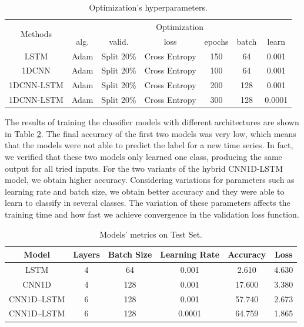 \begin{table}[h]
	\centering
	\small
	\begin{tabular}{|c|c|c|c|c|c|c|}
		\hline
		\multirow{2}{*}{Methods} & \multicolumn{6}{c|}{Optimization} \\
		\cline{2-7}
		& alg. & valid. & loss & epochs & batch & learn \\
		\cline{2-7}
		\hline
		LSTM & Adam & Split 20\% & Cross Entropy & 150 & 64 & 0.001 \\
		\hline
		1DCNN & Adam & Split 20\% & Cross Entropy & 100 & 64 & 0.001 \\
		\hline
		1DCNN-LSTM & Adam & Split 20\% & Cross Entropy & 200 & 128 & 0.001 \\
		\hline
		1DCNN-LSTM & Adam & Split 20\% & Cross Entropy & 300 & 128 & 0.0001 \\
		\hline
	\end{tabular}
	\caption{Optimization’s hyperparameters.}
	\label{Table:OptimizationNN}
\end{table}

The results of training the classifier models with different architectures are shown in Table \ref{Table:DLModels}. The final accuracy of the first two models was very low, which means that the models were not able to predict the label for a new time series. In fact, we verified that these two models only learned one class, producing the same output for all tried inputs. For the two variants of the hybrid CNN1D-LSTM model, we obtain higher accuracy. Considering variations for parameters such as learning rate and batch size, we obtain better accuracy and they were able to learn to classify in several classes. The variation of these parameters affects the training time and how fast we achieve convergence in the validation loss function. 

\begin{table}[h]
	\centering
	\small
	\begin{tabular}{|c|c|c|c|c|c|}
		\hline
		Model        & Layers & Batch Size & Learning Rate & Accuracy & Loss \\ \hline
		LSTM         & 4      &  64        & 0.001         &  2.610   & 4.630           \\
		CNN1D        & 4      & 128        & 0.001         & 17.600   & 3.380           \\
		CNN1D--LSTM  & 6      & 128        & 0.001         & 57.740   & 2.673           \\ 		
		CNN1D--LSTM  & 6      & 128        & 0.0001		   & 64.759   & 1.865           \\ \hline		
	\end{tabular}
\caption{Models' metrics on Test Set.}
\label{Table:DLModels}
\end{table}


